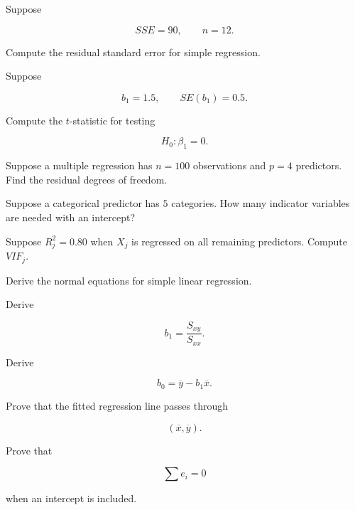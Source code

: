 \begin{exercise}[2]
Suppose

\[
SSE=90,
\qquad
n=12.
\]

Compute the residual standard error for simple regression.
\end{exercise}

\begin{exercise}[2]
Suppose

\[
b_1=1.5,
\qquad
SE(b_1)=0.5.
\]

Compute the \(t\)-statistic for testing

\[
H_0:\beta_1=0.
\]
\end{exercise}

\begin{exercise}[2]
Suppose a multiple regression has \(n=100\) observations and \(p=4\)
predictors. Find the residual degrees of freedom.
\end{exercise}

\begin{exercise}[2]
Suppose a categorical predictor has \(5\) categories. How many indicator
variables are needed with an intercept?
\end{exercise}

\begin{exercise}[2]
Suppose \(R_j^2=0.80\) when \(X_j\) is regressed on all remaining
predictors. Compute \(VIF_j\).
\end{exercise}

\begin{exercise}[3]
Derive the normal equations for simple linear regression.
\end{exercise}

\begin{exercise}[3]
Derive

\[
b_1
=
\frac{S_{xy}}{S_{xx}}.
\]
\end{exercise}

\begin{exercise}[3]
Derive

\[
b_0
=
\overline{y}
-
b_1\overline{x}.
\]
\end{exercise}

\begin{exercise}[3]
Prove that the fitted regression line passes through

\[
(\overline{x},\overline{y}).
\]
\end{exercise}

\begin{exercise}[3]
Prove that

\[
\sum e_i=0
\]

when an intercept is included.
\end{exercise}

